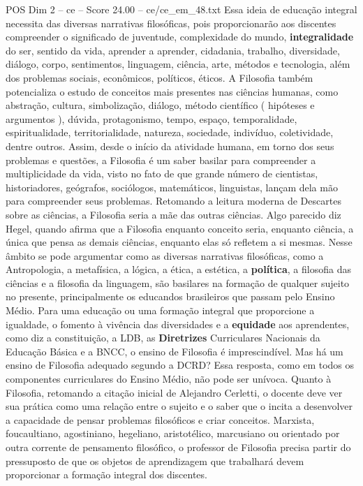 \begin{textsample}{POS Dim 2 – ce – Score 24.00 – ce/ce\_em\_48.txt}
Essa ideia de educação integral necessita das diversas narrativas filosóficas, pois proporcionarão aos discentes compreender o significado de juventude, complexidade do mundo, \textbf{integralidade} do ser, sentido da vida, aprender a aprender, cidadania, trabalho, diversidade, diálogo, corpo, sentimentos, linguagem, ciência, arte, métodos e tecnologia, além dos problemas sociais, econômicos, políticos, éticos.
A Filosofia também potencializa o estudo de conceitos mais presentes nas ciências humanas, como abstração, cultura, simbolização, diálogo, método científico ( hipóteses e argumentos ), dúvida, protagonismo, tempo, espaço, temporalidade, espiritualidade, territorialidade, natureza, sociedade, indivíduo, coletividade, dentre outros.
Assim, desde o início da atividade humana, em torno dos seus problemas e questões, a Filosofia é um saber basilar para compreender a multiplicidade da vida, visto no fato de que grande número de cientistas, historiadores, geógrafos, sociólogos, matemáticos, linguistas, lançam dela mão para compreender seus problemas.
Retomando a leitura moderna de Descartes sobre as ciências, a Filosofia seria a mãe das outras ciências.
Algo parecido diz Hegel, quando afirma que a Filosofia enquanto conceito seria, enquanto ciência, a única que pensa as demais ciências, enquanto elas só refletem a si mesmas.
Nesse âmbito se pode argumentar como as diversas narrativas filosóficas, como a Antropologia, a metafísica, a lógica, a ética, a estética, a \textbf{política}, a filosofia das ciências e a filosofia da linguagem, são basilares na formação de qualquer sujeito no presente, principalmente os educandos brasileiros que passam pelo Ensino Médio.
Para uma educação ou uma formação integral que proporcione a igualdade, o fomento à vivência das diversidades e a \textbf{equidade} aos aprendentes, como diz a constituição, a LDB, as \textbf{Diretrizes} Curriculares Nacionais da Educação Básica e a BNCC, o ensino de Filosofia é imprescindível.
Mas há um ensino de Filosofia adequado segundo a DCRD?
Essa resposta, como em todos os componentes curriculares do Ensino Médio, não pode ser unívoca.
Quanto à Filosofia, retomando a citação inicial de Alejandro Cerletti, o docente deve ver sua prática como uma relação entre o sujeito e o saber que o incita a desenvolver a capacidade de pensar problemas filosóficos e criar conceitos.
Marxista, foucaultiano, agostiniano, hegeliano, aristotélico, marcusiano ou orientado por outra corrente de pensamento filosófico, o professor de Filosofia precisa partir do pressuposto de que os objetos de aprendizagem que trabalhará devem proporcionar a formação integral dos discentes.

\end{textsample}
